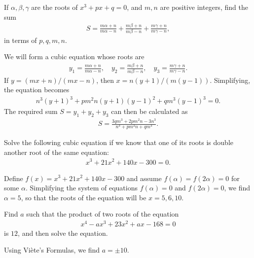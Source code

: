 \documentclass[12pt,a4paper]{memoir}
\theoremstyle{definition}
\begin{document}
\begin{question}
	If $\alpha, \beta, \gamma$ are the roots of $x^3+px+q=0$, and $m,n$ are positive integers, find the sum
	\begin{align*}
		S = \frac{m\alpha + n}{m\alpha-n} + \frac{m\beta + n}{m\beta-n} + \frac{m\gamma + n}{m\gamma-n},
	\end{align*}
	in terms of $p,q,m,n$.
\end{question}


\begin{solution}
	We will form a cubic equation whose roots are
	\begin{align*}
		y_1 = \frac{m\alpha + n}{m\alpha-n} ,\quad y_2= \frac{m\beta + n}{m\beta-n}, \quad y_3= \frac{m\gamma + n}{m\gamma-n}.
	\end{align*}
	If $y=(mx+n)/(mx-n)$, then $x=n(y+1)/(m(y-1))$. Simplifying, the equation becomes
	\begin{align*}
		n^3(y+1)^3 + pm^2n(y+1)(y-1)^2 + qm^3(y-1)^3=0.
	\end{align*}
	The required sum $S=y_1+y_2+y_3$ can then be calculated as
	\begin{align*}
		S = \frac{3qm^3+2pm^2n-3n^3}{n^3+pm^2n+qm^3}.
	\end{align*}
\end{solution}


\begin{question}
	Solve the following cubic equation if we know that one of its roots is double another root of the same equation:
	\begin{align*}
		x^3+21x^2+140x-300=0.
	\end{align*}
\end{question}

\begin{solution}
	Define $f(x)=x^3+21x^2+140x-300$ and assume $f(\alpha)=f(2\alpha)=0$ for some $\alpha$. Simplifying the system of equations $f(\alpha)=0$ and $f(2\alpha)=0$, we find $\alpha=5$, so that the roots of the equation will be $x=5,6,10$.
\end{solution}


\begin{question}
	Find $a$ such that the product of two roots of the equation
	\begin{align*}
		x^4-ax^3+23x^2+ax-168=0
	\end{align*}
	is $12$, and then solve the equation.
\end{question}

\begin{solution}
	Using Viète's Formulas, we find $a=\pm 10$.
\end{solution}
\end{document}
